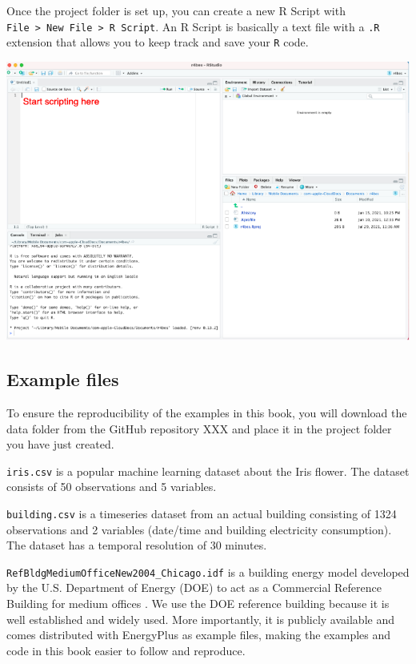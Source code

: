 \documentclass[
]{book}
\begin{document}
Once the project folder is set up, you can create a new R Script with \texttt{File\ \textgreater{}\ New\ File\ \textgreater{}\ R\ Script}. An R Script is basically a text file with a \texttt{.R} extension that allows you to keep track and save your \texttt{R} code.

\begin{center}\includegraphics[width=1\linewidth]{figures/script} \end{center}

\hypertarget{example-files}{%
\subsection*{Example files}\label{example-files}}

To ensure the reproducibility of the examples in this book, you will download the data folder from the GitHub repository XXX and place it in the project folder you have just created.

\texttt{iris.csv} is a popular machine learning dataset about the Iris flower. The dataset consists of 50 observations and 5 variables.

\texttt{building.csv} is a timeseries dataset from an actual building consisting of 1324 observations and 2 variables (date/time and building electricity consumption). The dataset has a temporal resolution of 30 minutes.

\texttt{RefBldgMediumOfficeNew2004\_Chicago.idf} is a building energy model developed by the U.S. Department of Energy (DOE) to act as a Commercial Reference Building for medium offices \citep{deru_us_2011}. We use the DOE reference building because it is well established and widely used. More importantly, it is publicly available and comes distributed with EnergyPlus as example files, making the examples and code in this book easier to follow and reproduce.
\end{document}
